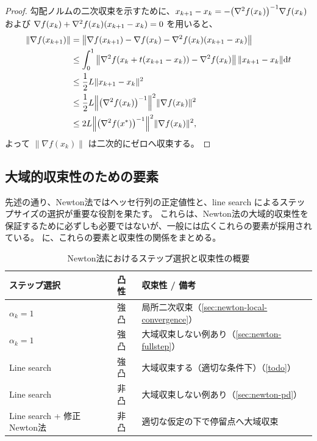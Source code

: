 \documentclass[a4paper, 10pt, dvipdfmx,draft]{article}
\begin{document}
\begin{proof}
    勾配ノルムの二次収束を示すために、$x_{k+1}-x_k=-\qty(\nabla^2 f(x_k))^{-1}\nabla f(x_k)$ および
    $\nabla f(x_k)+\nabla^2 f(x_k)\qty(x_{k+1}-x_k)=0$ を用いると、
    \begin{align*}
        \norm{\nabla f(x_{k+1})}
         & = \norm{\nabla f(x_{k+1})-\nabla f(x_k)-\nabla^2 f(x_k)\qty(x_{k+1}-x_k)}                 \\
         & \le \int_0^1 \norm{\nabla^2 f(x_k+t (x_{k+1}-x_k))-\nabla^2 f(x_k)}\,\|x_{k+1}-x_k\|\dd t \\
         & \le \frac{1}{2}L\|x_{k+1}-x_k\|^2                                                         \\
         & \le \frac{1}{2}L\norm{\qty(\nabla^2 f(x_k))^{-1}}^2\|\nabla f(x_k)\|^2                    \\
         & \le 2L\norm{\qty(\nabla^2 f(x^*))^{-1}}^2\|\nabla f(x_k)\|^2,
    \end{align*}
    よって $\|\nabla f(x_k)\|$ は二次的にゼロへ収束する。
\end{proof}

\subsection{大域的収束性のための要素}

先述の通り、Newton法ではヘッセ行列の正定値性と、line search によるステップサイズの選択が重要な役割を果たす。
これらは、Newton法の大域的収束性を保証するために必ずしも必要ではないが、一般には広くこれらの要素が採用されている。
に、これらの要素と収束性の関係をまとめる。

\begin{table}[htbp]
    \centering
    \caption{Newton法におけるステップ選択と収束性の概要}
    \label{tab:newton_convergence}
    \begin{tabular}{lll}
        \toprule
        ステップ選択                  & 凸性 & 収束性 / 備考                                                \\
        \midrule
        $\alpha_k=1$            & 強凸 & 局所二次収束（\cref{sec:newton-local-convergence}）             \\
        $\alpha_k=1$            & 強凸 & 大域収束しない例あり（\cref{sec:newton-fullstep}）                  \\
        Line search             & 強凸 & 大域収束する（適切な条件下）（\cref{todo}）                             \\
        Line search             & 非凸 & 大域収束しない例あり（\cref{sec:newton-pd}）                        \\
        Line search + 修正Newton法 & 非凸 & 適切な仮定の下で停留点へ大域収束 \citep[Thm.~3.8]{nocedal1999numerical} \\
        \bottomrule
    \end{tabular}
\end{table}
\end{document}
